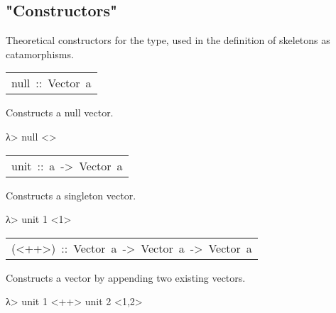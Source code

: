 \subsection{"Constructors"}
Theoretical constructors for the  type, used in the
 definition of skeletons as catamorphisms.\par

\begin{haddockdesc}
\item[\begin{tabular}{@{}l}
null\ ::\ Vector\ a
\end{tabular}]\haddockbegindoc
Constructs a null vector.\par
\begin{interactive}
λ> null
<>

\end{interactive}

\item[\begin{tabular}{@{}l}
unit\ ::\ a\ ->\ Vector\ a
\end{tabular}]\haddockbegindoc
Constructs a singleton vector.\par
\begin{interactive}
λ> unit 1
<1>

\end{interactive}

\item[\begin{tabular}{@{}l}
(<++>)\ ::\ Vector\ a\ ->\ Vector\ a\ ->\ Vector\ a
\end{tabular}]\haddockbegindoc
Constructs a vector by appending two existing vectors.\par
\begin{interactive}
λ> unit 1 <++> unit 2
<1,2>

\end{interactive}
\end{haddockdesc}
